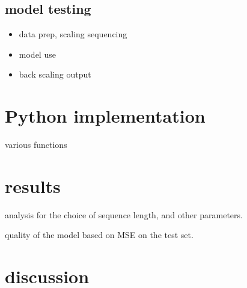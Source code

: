 \subsection{model testing}
\begin{itemize}
\item data prep, scaling \+ sequencing
\item model use
\item back scaling output
\end{itemize}


\section{Python implementation}
 various functions


\section{results}
analysis for the choice of sequence length, and other parameters.

quality of the model based on MSE on the test set. 




\section{discussion}


%


